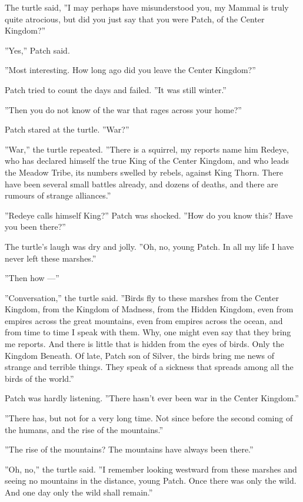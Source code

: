 \documentclass[12pt]{book}
\begin{document}
The turtle said, ''I may perhaps have misunderstood you, my Mammal is
truly quite atrocious, but did you just say that you were Patch, of
the Center Kingdom?''

''Yes,'' Patch said.

''Most interesting. How long ago did you leave the Center Kingdom?''

Patch tried to count the days and failed. ''It was still winter.''

''Then you do not know of the war that rages across your home?''

Patch stared at the turtle. ''War?''

''War,'' the turtle repeated. ''There is a squirrel, my reports name
him Redeye, who has declared himself the true King of the Center
Kingdom, and who leads the Meadow Tribe, its numbers swelled by
rebels, against King Thorn. There have been several small battles
already, and dozens of deaths, and there are rumours of strange
alliances.''

''Redeye calls himself King?'' Patch was shocked. ''How do you know
this? Have you been there?''

The turtle's laugh was dry and jolly. ''Oh, no, young Patch. In all my
life I have never left these marshes.''

''Then how ---''

''Conversation,'' the turtle said. ''Birds fly to these marshes from
the Center Kingdom, from the Kingdom of Madness, from the Hidden
Kingdom, even from empires across the great mountains, even from
empires across the ocean, and from time to time I speak with
them. Why, one might even say that they bring me reports. And there is
little that is hidden from the eyes of birds. Only the Kingdom
Beneath. Of late, Patch son of Silver, the birds bring me news of
strange and terrible things. They speak of a sickness that spreads
among all the birds of the world.''

Patch was hardly listening. ''There hasn't ever been war in the Center
Kingdom.''

''There has, but not for a very long time. Not since before the second
coming of the humans, and the rise of the mountains.''

''The rise of the mountains? The mountains have always been there.''

''Oh, no,'' the turtle said. ''I remember looking westward from these
marshes and seeing no mountains in the distance, young Patch. Once
there was only the wild. And one day only the wild shall remain.''
\end{document}
